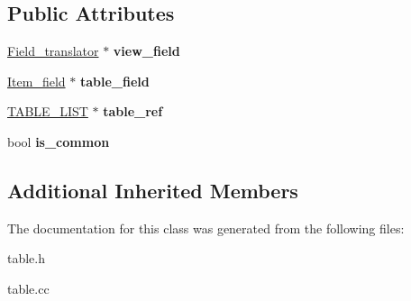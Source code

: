 \subsection*{Public Attributes}
\begin{DoxyCompactItemize}
\item 
\mbox{\label{classNatural__join__column_a38e4a82748d122fa18aa017b37ed680a}} 
\mbox{\hyperlink{structField__translator}{Field\+\_\+translator}} $\ast$ {\bfseries view\+\_\+field}
\item 
\mbox{\label{classNatural__join__column_a0f2011b6727a3c9b3bcf3c3537743d40}} 
\mbox{\hyperlink{classItem__field}{Item\+\_\+field}} $\ast$ {\bfseries table\+\_\+field}
\item 
\mbox{\label{classNatural__join__column_af2ea92d11b41676af568688768dd2fad}} 
\mbox{\hyperlink{structTABLE__LIST}{T\+A\+B\+L\+E\+\_\+\+L\+I\+ST}} $\ast$ {\bfseries table\+\_\+ref}
\item 
\mbox{\label{classNatural__join__column_a87ba5b7af15996c614f362bd4db64c89}} 
bool {\bfseries is\+\_\+common}
\end{DoxyCompactItemize}
\subsection*{Additional Inherited Members}


The documentation for this class was generated from the following files\+:\begin{DoxyCompactItemize}
\item 
table.\+h\item 
table.\+cc\end{DoxyCompactItemize}
